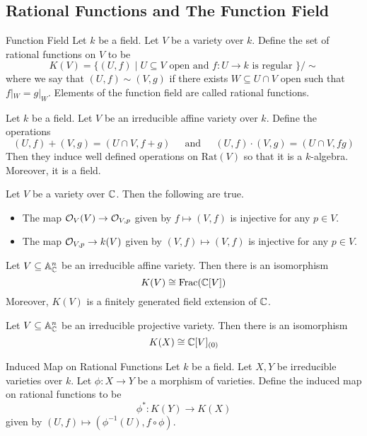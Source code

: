 \documentclass[a4paper]{article}
\begin{document}
\subsection{Rational Functions and The Function Field}
\begin{defn}{Function Field}{} Let $k$ be a field. Let $V$ be a variety over $k$. Define the set of rational functions on $V$ to be $$K(V)=\{(U,f)\;|\;U\subseteq V\text{ open and }f:U\to k\text{ is regular }\}/\sim$$ where we say that $(U,f)\sim(V,g)$ if there exists $W\subseteq U\cap V$ open such that $f|_W=g|_W$. Elements of the function field are called rational functions. 
\end{defn}

\begin{lmm}{}{} Let $k$ be a field. Let $V$ be an irreducible affine variety over $k$. Define the operations $$(U,f)+(V,g)=(U\cap V,f+g)\;\;\;\;\text{ and }\;\;\;\;(U,f)\cdot(V,g)=(U\cap V,fg)$$ Then they induce well defined operations on $\text{Rat}(V)$ so that it is a $k$-algebra. Moreover, it is a field. 
\end{lmm}

\begin{lmm}{}{} Let $V$ be a variety over $\mathbb{C}$. Then the following are true. 
\begin{itemize}
\item The map $\mathcal{O}_V(V)\to\mathcal{O}_{V,p}$ given by $f\mapsto(V,f)$ is injective for any $p\in V$. 
\item The map $\mathcal{O}_{V,p}\to k(V)$ given by $(V,f)\mapsto(V,f)$ is injective for any $p\in V$. 
\end{itemize}
\end{lmm}

\begin{prp}{}{} Let $V\subseteq\mathbb{A}_{\mathbb{C}}^n$ be an irreducible affine variety. Then there is an isomorphism $$K(V)\cong\text{Frac}(\mathbb{C}[V])$$ Moreover, $K(V)$ is a finitely generated field extension of $\mathbb{C}$. 
\end{prp}

\begin{prp}{}{} Let $V\subseteq\mathbb{A}_{\mathbb{C}}^n$ be an irreducible projective variety. Then there is an isomorphism $$K(X)\cong\mathbb{C}[V]_{(0)}$$ 
\end{prp}

\begin{defn}{Induced Map on Rational Functions}{} Let $k$ be a field. Let $X,Y$ be irreducible varieties over $k$. Let $\phi:X\to Y$ be a morphism of varieties. Define the induced map on rational functions to be $$\phi^\ast:K(Y)\to K(X)$$ given by $(U,f)\mapsto (\phi^{-1}(U),f\circ\phi)$. 
\end{defn}
\end{document}
